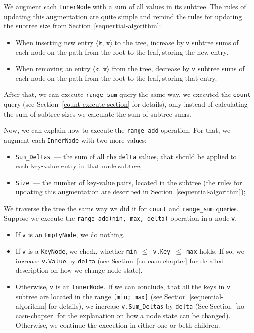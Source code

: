 \documentclass[times, dvipsnames,%
               languages={russian,english} %
              ]{itmo-student-thesis}
\begin{document}
We augment each \texttt{InnerNode} with a sum of all values in its subtree. The rules of updating this augmentation are quite simple and remind the rules for updating the subtree size from Section~\ref{sequential-algorithm}:

\begin{itemize}
    \item When inserting new entry $\langle \texttt{k, v} \rangle$ to the tree, increase by \texttt{v} subtree sums of each node on the path from the root to the leaf, storing the new entry.
    
    \item When removing an entry $\langle \texttt{k, v} \rangle$ from the tree, decrease by \texttt{v} subtree sums of each node on the path from the root to the leaf, storing that entry.
\end{itemize}

\bigbreak

After that, we can execute \texttt{range\_sum} query the same way, we executed the \texttt{count} query (see Section~\ref{count-execute-section} for details), only instead of calculating the sum of subtree sizes we calculate the sum of subtree sums.

Now, we can explain how to execute the \texttt{range\_add} operation. For that, we augment each \texttt{InnerNode} with two more values:

\begin{itemize}
    \item \texttt{Sum\_Deltas}~--- the sum of all the \texttt{delta} values, that should be applied to each key-value entry in that node subtree;
    
    \item \texttt{Size}~--- the number of key-value pairs, located in the subtree (the rules for updating this augmentation are described in Section~\ref{sequential-algorithm});
\end{itemize}

We traverse the tree the same way we did it for \texttt{count} and \texttt{range\_sum} queries. Suppose we execute the \texttt{range\_add(min, max, delta)} operation in a node \texttt{v}.

\begin{itemize}
    \item If \texttt{v} is an \texttt{EmptyNode}, we do nothing.
    
    \item If \texttt{v} is a \texttt{KeyNode}, we check, whether \texttt{min $\leq$ v.Key $\leq$ max} holds. If so, we increase \texttt{v.Value} by \texttt{delta} (see Section~\ref{no-casn-chapter} for detailed description on how we change node state).
    
    \item Otherwise, \texttt{v} is an \texttt{InnerNode}. If we can conclude, that all the keys in \texttt{v} subtree are located in the range \texttt{[min; max]} (see Section~\ref{sequential-algorithm} for details), we increase \texttt{v.Sum\_Deltas} by \texttt{delta} (See Section~\ref{no-casn-chapter} for the explanation on how a node state can be changed). Otherwise, we continue the execution in either one or both children.
\end{itemize}
\end{document}
